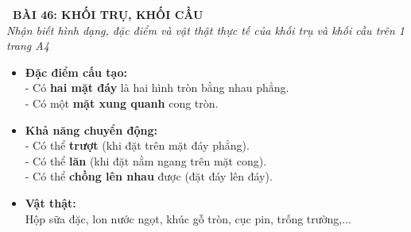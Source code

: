 \documentclass[11pt,a4paper]{article}
\begin{document}
\begin{tcolorbox}[
  enhanced,
  colback=violet!8!white,
  colframe=violet!70!black,
  arc=3mm, boxrule=1.2pt,
  left=3mm, right=3mm, top=2mm, bottom=2mm,
  halign=center
]
  {\LARGE\bfseries\color{violet!90!black}\faBookmark\ BÀI 46: KHỐI TRỤ, KHỐI CẦU}\\[1mm]
  {\itshape\footnotesize\color{black!75} Nhận biết hình dạng, đặc điểm và vật thật thực tế của khối trụ và khối cầu trên 1 trang A4}
\end{tcolorbox}

\vspace{-2mm}

\noindent
\begin{minipage}[t]{0.49\textwidth}\vspace{0pt}
\begin{tcolorbox}[
  enhanced,
  colback=violet!4!white,
  colframe=violet!75!black,
  arc=2mm, boxrule=0.8pt,
  left=2mm, right=2mm, top=1.8mm, bottom=1.8mm,
  title={\footnotesize\bfseries\color{white}\faKey\ 1. Khối trụ}
]
{\footnotesize
\begin{itemize}\setlength{\itemsep}{1pt}\setlength{\leftskip}{-2.5mm}
  \item \textbf{Đặc điểm cấu tạo:}\\
  - Có \textbf{hai mặt đáy} là hai hình tròn bằng nhau phẳng.\\
  - Có một \textbf{mặt xung quanh} cong tròn.
  \item \textbf{Khả năng chuyển động:}\\
  - Có thể \textbf{trượt} (khi đặt trên mặt đáy phẳng).\\
  - Có thể \textbf{lăn} (khi đặt nằm ngang trên mặt cong).\\
  - Có thể \textbf{chồng lên nhau} được (đặt đáy lên đáy).
  \item \textbf{Vật thật:}\\
  Hộp sữa đặc, lon nước ngọt, khúc gỗ tròn, cục pin, trống trường,...
\end{itemize}
}
\end{tcolorbox}
\end{minipage}
\hfill
\end{document}
